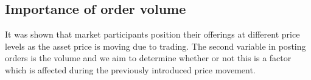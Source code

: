 
\subsection{Importance of order volume}
\label{sec:data-hypthesis-order-volume}

It was shown that market participants position their offerings at different price levels as the asset price is moving due to trading.
The second variable in posting orders is the volume and we aim to determine whether or not this is a factor which is affected during the previously introduced price movement.

